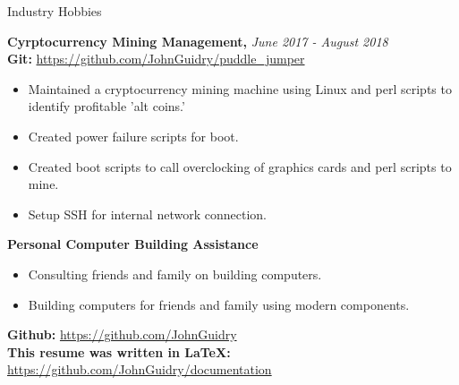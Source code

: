 \documentclass{resume} %
\begin{document}

\begin{rSection}{Industry Hobbies} 

{\bf Cyrptocurrency Mining Management, }{\em June 2017 - August 2018} 
\\
{\bf Git: }\url {https://github.com/JohnGuidry/puddle_jumper}
\begin{itemize}
\item Maintained a cryptocurrency mining machine using Linux and perl scripts to identify profitable 'alt coins.'
\item Created power failure scripts for boot.
\item Created boot scripts to call overclocking of graphics cards and perl scripts to mine.
\item Setup SSH for internal network connection.
\end{itemize}

{\bf Personal Computer Building Assistance}
\begin{itemize}
\item Consulting friends and family on building computers.
\item Building computers for friends and family using modern components.
\end{itemize}

{\bf Github: }\url{https://github.com/JohnGuidry}
\\
{\bf This resume was written in LaTeX: }\url{https://github.com/JohnGuidry/documentation}
\end{rSection}
\end{document}
